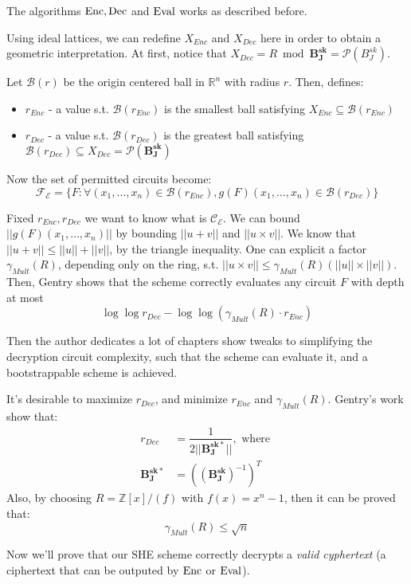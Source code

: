 The algorithms $\operatorname{Enc},\operatorname{Dec}$ and $\operatorname{Eval}$ works as described before. 

Using ideal lattices, we can redefine $X_{Enc}$ and $X_{Dec}$ here in order to obtain a geometric interpretation. At first, notice that $X_{Dec}=R\bmod\mathbf{B_J^{sk}}=\mathcal{P}(B_J^{sk})$.

Let $\mathcal{B}(r)$ be the origin centered ball in $\mathbb{R}^n$ with radius $r$. Then, defines:
\begin{itemize}
    \item $r_{Enc}$ - a value s.t.  $\mathcal{B}(r_{Enc})$ is the smallest ball satisfying  $X_{Enc}\subseteq\mathcal{B}(r_{Enc})$
    \item $r_{Dec}$ - a value s.t. $\mathcal{B}(r_{Dec})$ is the greatest ball satisfying $\mathcal{B}(r_{Dec})\subseteq X_{Dec}=\mathcal{P}(\mathbf{B_J^{sk}})$
\end{itemize}
Now the set of permitted circuits become:
$$\mathcal{F_E}=\{F:\forall (x_1,\ldots,x_n)\in \mathcal{B}(r_{Enc}), g(F)(x_1,\ldots,x_n)\in \mathcal{B}(r_{Dec})\}$$

Fixed $r_{Enc},r_{Dec}$ we want to know what is $\mathcal{C_E}$. We can bound $||g(F)(x_1,\ldots,x_n)||$ by bounding $||u+v||$ and $||u\times v||$. We know that $||u+v||\leq ||u||+||v||$, by the triangle inequality. One can explicit a factor $\gamma_{Mult}(R)$, depending only on the ring, s.t. $||u\times v||\leq\gamma_{Mult}(R)(||u||\times||v||)$.
Then, Gentry shows that the scheme correctly evaluates any circuit $F$ with depth at most
$$\log\log r_{Dec}-\log\log(\gamma_{Mult}(R)\cdot r_{Enc})$$

Then the author dedicates a lot of chapters show tweaks to  simplifying the decryption circuit complexity, such that the scheme can evaluate it, and a bootstrappable scheme is achieved.

It's desirable to maximize $r_{Dec}$, and minimize $r_{Enc}$ and $\gamma_{Mult}(R)$. Gentry's work show that:
\begin{align*}
    r_{Dec}&=\dfrac{1}{2||\mathbf{B_J^{sk*}}||},\text{ where }\\
    \mathbf{B_J^{sk*}}&=((\mathbf{B_J^{sk}})^{-1})^T
\end{align*}
Also, by choosing $R=\mathbb{Z}[x]/(f)$ with $f(x)=x^n-1$, then it can be proved that:
$$\gamma_{Mult}(R)\leq\sqrt{n}$$

Now we'll prove that our SHE scheme correctly decrypts a \textit{valid cyphertext} (a ciphertext that can be outputed by $\operatorname{Enc}$ or $\operatorname{Eval}$).



